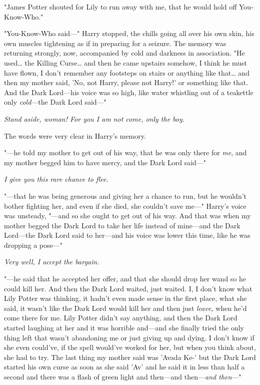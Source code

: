 "James Potter shouted for Lily to run away with me, that he would hold off You-Know-Who."

"You-Know-Who said---" Harry stopped, the chills going all over his own skin, his own muscles tightening as if in preparing for a seizure. The memory was returning strongly, now, accompanied by cold and darkness in association. "He used{\ldots} the Killing Curse{\ldots} and then he came upstairs somehow, I think he must have flown, I don't remember any footsteps on stairs or anything like that{\ldots} and then my mother said, 'No, not Harry, please not Harry!' or something like that. And the Dark Lord---his voice was so high, like water whistling out of a teakettle only \emph{cold}---the Dark Lord said---"

\emph{Stand aside, woman! For you I am not come, only the boy.}

The words were very clear in Harry's memory.

"---he told my mother to get out of his way, that he was only there for \emph{me}, and my mother begged him to have mercy, and the Dark Lord said---"

\emph{I give you this rare chance to flee.}

"---that he was being generous and giving her a chance to run, but he wouldn't bother fighting her, and even if she died, she couldn't save me---" Harry's voice was unsteady, "---and so she ought to get out of his way. And that was when my mother begged the Dark Lord to take her life instead of mine---and the Dark Lord---the Dark Lord said to her---and his voice was lower this time, like he was dropping a pose---"

\emph{Very well, I accept the bargain.}

"---he said that he accepted her offer, and that she should drop her wand so he could kill her. And then the Dark Lord waited, just waited. I, I don't know what Lily Potter was thinking, it hadn't even made sense in the first place, what she said, it wasn't like the Dark Lord would kill her and then just \emph{leave,} when he'd come there for me. Lily Potter didn't say anything, and then the Dark Lord started laughing at her and it was horrible and---and she finally tried the only thing left that wasn't abandoning me or just giving up and dying. I don't know if she even could've, if the spell would've worked for her, but when you think about, she had to try. The last thing my mother said was 'Avada Ke-' but the Dark Lord started his own curse as soon as she said 'Av' and he said it in less than half a second and there was a flash of green light and then---and then---\emph{and then}---"

